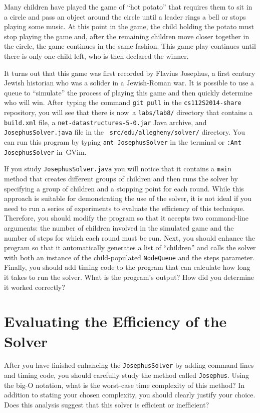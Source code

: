   Many children have played the game of ``hot potato'' that requires them to sit in a circle and pass an object around
  the circle until a leader rings a bell or stops playing some music.  At this point in the game, the child holding the
  potato must stop playing the game and, after the remaining children move closer together in the circle, the game
  continues in the same fashion. This game play continues until there is only one child left, who is then declared the
  winner.

  It turns out that this game was first recorded by Flavius Josephus, a first century Jewish historian who was a solider
  in a Jewish-Roman war.  It is possible to use a queue to ``simulate'' the process of playing this game and then
  quickly determine who will win.  \mbox{After typing} the command {\tt git pull} in the {\tt cs112S2014-share}
  repository, you will see that there is \mbox{now a} {\tt labs/lab8/} directory that contains a {\tt build.xml} file, a
  {\tt net-datastructures-5-0.jar} Java archive, and {\tt JosephusSolver.java} file in the {\tt
    src/edu/allegheny/solver/} directory.  You can run this program by typing {\tt ant JosephusSolver} in the terminal
  or {\tt :Ant JosephusSolver} \mbox{in GVim}.

  If you study {\tt JosephusSolver.java} you will notice that it contains a {\tt main} method that creates different
  groups of children and then runs the solver by specifying a group of children and a stopping point for each round.
  While this approach is suitable for demonstrating the use of the solver, it is not ideal if you need to run a series
  of experiments to evaluate the efficiency of this technique. Therefore, you should modify the program so that it
  accepts two command-line arguments: the number of children involved in the simulated game and the number of steps for
  which each round must be run. Next, you should enhance the program so that it automatically generates a list of
  ``children'' and calls the solver with both an instance of the child-populated {\tt NodeQueue} and the steps
  parameter. Finally, you should add timing code to the program that can calculate how long it takes to run the solver.
  What is the program's output? How did you determine it worked correctly?

\section*{Evaluating the Efficiency of the Solver}

  After you have finished enhancing the {\tt JosephusSolver} by adding command lines and timing code, you should
  carefully study the method called {\tt Josephus}.  Using the big-O notation, what is the worst-case time complexity of
  this method?  In addition to stating your chosen complexity, you should clearly justify your choice. Does this
  analysis suggest that this solver is efficient or inefficient?

